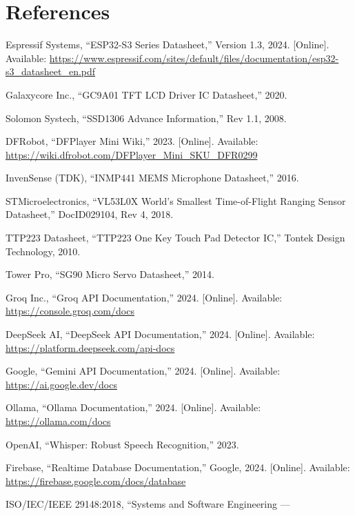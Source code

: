 \documentclass[12pt,a4paper]{article}
\begin{document}
\newpage
\section*{References}

\begin{enumerate}[label={[\arabic*]}, leftmargin=*]
\item Espressif Systems, ``ESP32-S3 Series Datasheet,'' Version 1.3,
      2024. [Online]. Available: \url{https://www.espressif.com/sites/default/files/documentation/esp32-s3_datasheet_en.pdf}
\item Galaxycore Inc., ``GC9A01 TFT LCD Driver IC Datasheet,'' 2020.
\item Solomon Systech, ``SSD1306 Advance Information,'' Rev 1.1, 2008.
\item DFRobot, ``DFPlayer Mini Wiki,'' 2023. [Online]. Available:
      \url{https://wiki.dfrobot.com/DFPlayer_Mini_SKU_DFR0299}
\item InvenSense (TDK), ``INMP441 MEMS Microphone Datasheet,'' 2016.
\item STMicroelectronics, ``VL53L0X World's Smallest Time-of-Flight
      Ranging Sensor Datasheet,'' DocID029104, Rev 4, 2018.
\item TTP223 Datasheet, ``TTP223 One Key Touch Pad Detector IC,''
      Tontek Design Technology, 2010.
\item Tower Pro, ``SG90 Micro Servo Datasheet,'' 2014.
\item Groq Inc., ``Groq API Documentation,'' 2024. [Online]. Available:
      \url{https://console.groq.com/docs}
\item DeepSeek AI, ``DeepSeek API Documentation,'' 2024. [Online].
      Available: \url{https://platform.deepseek.com/api-docs}
\item Google, ``Gemini API Documentation,'' 2024. [Online]. Available:
      \url{https://ai.google.dev/docs}
\item Ollama, ``Ollama Documentation,'' 2024. [Online]. Available:
      \url{https://ollama.com/docs}
\item OpenAI, ``Whisper: Robust Speech Recognition,'' 2023.
\item Firebase, ``Realtime Database Documentation,'' Google, 2024.
      [Online]. Available:
      \url{https://firebase.google.com/docs/database}
\item ISO/IEC/IEEE 29148:2018, ``Systems and Software Engineering ---

\end{enumerate}
\end{document}
